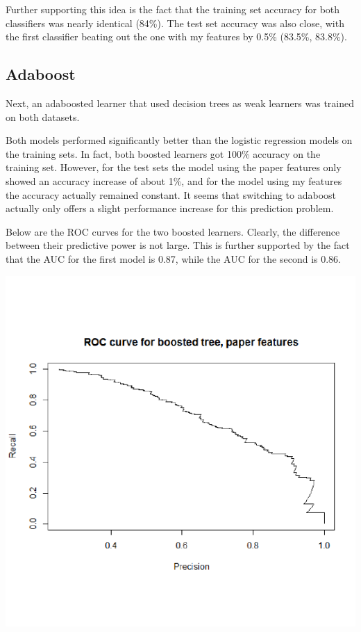 \documentclass{article}\usepackage[]{graphicx}\usepackage[]{color}
\makeatletter
\def\maxwidth{ %
  \ifdim\Gin@nat@width>\linewidth
    \linewidth
  \else
    \Gin@nat@width
  \fi
}
\newenvironment{knitrout}{}{} %
\makeatother
\begin{document}
Further supporting this idea is the fact that the training set accuracy for both classifiers was nearly identical (84\%). The test set accuracy was also close, with the first classifier beating out the one with my features by 0.5\% (83.5\%, 83.8\%).

\subsection{Adaboost}

Next, an adaboosted learner that used decision trees as weak learners was trained on both datasets.

Both models performed significantly better than the logistic regression models on the training sets. In fact, both boosted learners got 100\% accuracy on the training set. However, for the test sets the model using the paper features only showed an accuracy increase of about 1\%, and for the model using my features the accuracy actually remained constant. It seems that switching to adaboost actually only offers a slight performance increase for this prediction problem.

Below are the ROC curves for the two boosted learners. Clearly, the difference between their predictive power is not large. This is further supported by the fact that the AUC for the first model is 0.87, while the AUC for the second is 0.86.


\begin{knitrout}
\color{fgcolor}

{\centering \includegraphics[width=\maxwidth]{figure/unnamed-chunk-14-1} 

}



\end{knitrout}
\end{document}

